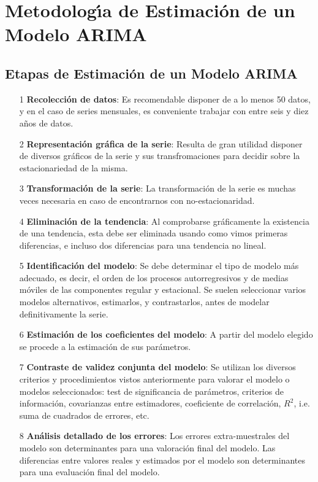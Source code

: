 \section{Metodolog\'{\i}a de Estimaci\'on de un Modelo ARIMA}
\subsection{Etapas de Estimaci\'on de un Modelo ARIMA}

\begin{itemize}
\item[1] \textbf{Recolecci\'on de datos}: Es recomendable disponer de a lo menos 50 datos, y en el caso de series mensuales, es conveniente trabajar con entre seis y diez a\~nos de datos.
\item[2] \textbf{Representaci\'on gr\'afica de la serie}: Resulta de gran utilidad disponer de diversos gr\'aficos de la serie y sus transfromaciones para decidir sobre la estacionariedad de la misma.
\item[3] \textbf{Transformaci\'on de la serie}: La transformaci\'on de la serie es muchas veces necesaria en caso de encontrarnos con no-estacionaridad.
\item[4] \textbf{Eliminaci\'on de la tendencia}: Al comprobarse gr\'aficamente la existencia de una tendencia, esta debe ser eliminada usando como vimos primeras diferencias, e incluso dos diferencias para una tendencia no lineal.
\item[5] \textbf{Identificaci\'on del modelo}: Se debe determinar el tipo de modelo m\'as adecuado, es decir, el orden de los procesos autorregresivos y de medias m\'oviles de las componentes regular y estacional. Se suelen seleccionar varios modelos alternativos, estimarlos, y contrastarlos, antes de modelar definitivamente la serie.
\item[6] \textbf{Estimaci\'on de los coeficientes del modelo}: A partir del modelo elegido se procede a la estimaci\'on de sus par\'ametros.
\item[7] \textbf{Contraste de validez conjunta del modelo}: Se utilizan los diversos criterios y procedimientos vistos anteriormente para valorar el modelo o modelos seleccionados: test de significancia de par\'ametros, criterios de informaci\'on, covarianzas entre estimadores, coeficiente de correlaci\'on, $R^2$, i.e. suma de cuadrados de errores, etc.
\item[8] \textbf{An\'alisis detallado de los errores}: Los errores extra-muestrales del modelo son determinantes para una valoraci\'on final del modelo. Las diferencias entre valores reales y estimados por el modelo son determinantes para una evaluaci\'on final del modelo.

\end{itemize}
